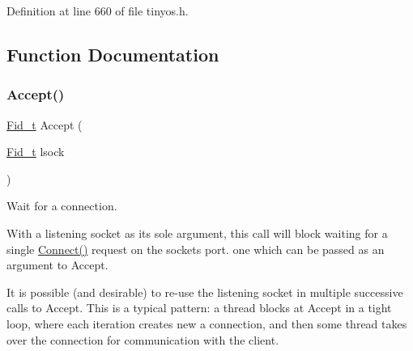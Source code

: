 Definition at line 660 of file tinyos.\+h.



\subsection{Function Documentation}
\mbox{\label{group__syscalls_ga8116ee944d1b03b6fb2fdba59b57d4a8}} 
\subsubsection{\texorpdfstring{Accept()}{Accept()}}
{\footnotesize\ttfamily \hyperlink{group__syscalls_ga5097222c5f0da97d92d4712359abc38f}{Fid\+\_\+t} Accept (\begin{DoxyParamCaption}\item[{\hyperlink{group__syscalls_ga5097222c5f0da97d92d4712359abc38f}{Fid\+\_\+t}}]{lsock }\end{DoxyParamCaption})}



Wait for a connection. 

With a listening socket as its sole argument, this call will block waiting for a single {\ttfamily \hyperlink{group__syscalls_ga747ceadd43e9a4c72b08fffbadaefbdd}{Connect()}} request on the socket\textquotesingle{}s port. one which can be passed as an argument to {\ttfamily Accept}.

It is possible (and desirable) to re-\/use the listening socket in multiple successive calls to Accept. This is a typical pattern\+: a thread blocks at Accept in a tight loop, where each iteration creates new a connection, and then some thread takes over the connection for communication with the client.



